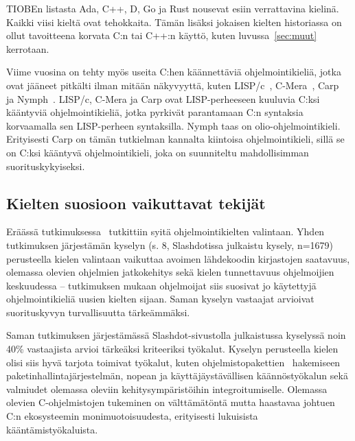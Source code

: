 TIOBEn listasta Ada, C++, D, Go ja Rust nousevat esiin verrattavina kielinä.
Kaikki viisi kieltä ovat tehokkaita. Tämän lisäksi jokaisen kielten historiassa
on ollut tavoitteena korvata C:n tai C++:n käyttö, kuten luvussa~\ref{sec:muut}
kerrotaan.

Viime vuosina on tehty myös useita C:hen käännettäviä ohjelmointikieliä, jotka
ovat jääneet pitkälti ilman mitään näkyvyyttä, kuten LISP/c~\citep{clisp1},
C-Mera~\citep{clisp2}, Carp~\citep{clisp3} ja Nymph~\citep{nymph}. LISP/c,
C-Mera ja Carp ovat LISP-perheeseen kuuluvia C:ksi kääntyviä ohjelmointikieliä,
jotka pyrkivät parantamaan C:n syntaksia korvaamalla sen LISP-perheen
syntaksilla. Nymph taas on olio-ohjelmointikieli. Erityisesti Carp on tämän
tutkielman kannalta kiintoisa ohjelmointikieli, sillä se on C:ksi kääntyvä
ohjelmointikieli, joka on suunniteltu mahdollisimman suorituskykyiseksi.


\subsection{Kielten suosioon vaikuttavat tekijät}


Eräässä tutkimuksessa~\citep{empiricalpopularity} tutkittiin syitä
ohjelmointikielten valintaan. Yhden tutkimuksen järjestämän kyselyn (s. 8,
\mbox{Slashdotissa} julkaistu kysely, n=1679) perusteella kielen valintaan
vaikuttaa avoimen lähdekoodin kirjastojen saatavuus, olemassa olevien ohjelmien
jatkokehitys sekä kielen tunnettavuus ohjelmoijien keskuudessa -- tutkimuksen
mukaan ohjelmoijat siis suosivat jo käytettyjä ohjelmointikieliä uusien kielten
sijaan. Saman kyselyn vastaajat arvioivat suorituskyvyn turvallisuutta
tärkeämmäksi.

Saman tutkimuksen järjestämässä Slashdot-sivustolla julkaistussa kyselyssä noin
40\% vastaajista arvioi tärkeäksi kriteeriksi työkalut. Kyselyn perusteella
kielen olisi siis hyvä tarjota toimivat työkalut, kuten
ohjelmistopakettien~ hakemiseen
paketinhallintajärjestelmän, nopean ja
käyttäjäystävällisen käännöstyökalun sekä valmiudet olemassa oleviin
kehitysympäristöihin integroitumiselle. Olemassa olevien C-ohjelmistojen
tukeminen on välttämätöntä mutta haastavaa johtuen C:n ekosysteemin
monimuotoisuudesta, erityisesti lukuisista kääntämistyökaluista.

